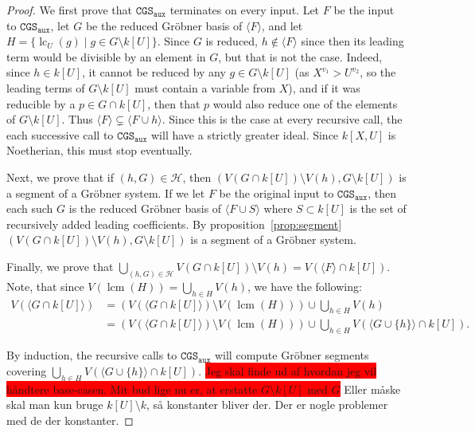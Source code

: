 \documentclass[a4paper, 12pt]{article}
\DeclareMathOperator{\LC}{lc}
\DeclareMathOperator{\lcm}{lcm}
\theoremstyle{changedot}
\theoremstyle{changedotbreak}
\theoremstyle{nonumberplain}
\newtheorem{proof}{Proof}
\begin{document}
\begin{proof}
  We first prove that $\mathtt{CGS_{aux}}$ terminates on every input. Let $F$ be the input to $\mathtt{CGS_{aux}}$, let $G$ be the reduced Gröbner basis of $\langle F \rangle$, and let $H = \{\LC_{U}(g) \mid g \in G \setminus k[U]\}$. Since $G$ is reduced, $h \notin \langle F \rangle$ since then its leading term would be divisible by an element in $G$, but that is not the case. Indeed, since $h \in k[U]$, it cannot be reduced by any $g \in G \setminus k[U]$ (as $X^{v_{1}} > U^{v_{2}}$, so the leading terms of $G \setminus k[U]$ must contain a variable from $X$), and if it was reducible by a $p \in G \cap k[U]$, then that $p$ would also reduce one of the elements of $G \setminus k[U]$. Thus $\langle F \rangle \subsetneq \langle F \cup {h} \rangle$. Since this is the case at every recursive call, the each successive call to $\mathtt{CGS_{aux}}$ will have a strictly greater ideal. Since $k[X, U]$ is Noetherian, this must stop eventually.

  Next, we prove that if $(h, G) \in \mathcal H$, then $(V(G \cap k[U]) \setminus V(h), G \setminus k[U])$ is a segment of a Gröbner system. If we let $F$ be the original input to $\mathtt{CGS_{aux}}$, then each such $G$ is the reduced Gröbner basis of $\langle F \cup S \rangle$ where $S \subset k[U]$ is the set of recursively added leading coefficients. By proposition~\ref{prop:segment} $(V(G \cap k[U]) \setminus V(h), G \setminus k[U])$ is a segment of a Gröbner system.

  Finally, we prove that $\bigcup_{(h, G) \in \mathcal H} V(G \cap k[U]) \setminus V(h) = V(\langle F \rangle \cap k[U])$. Note, that since $V(\lcm(H)) = \bigcup_{h \in H} V(h)$, we have the following:
  \begin{align*} V(\langle G \cap k[U] \rangle)
    &= \left( V(\langle G \cap k[U] \rangle) \setminus V(\lcm(H)) \right) \cup \bigcup_{h \in H} V(h) \\
    &= \left( V(\langle G \cap k[U] \rangle) \setminus V(\lcm(H)) \right) \cup \bigcup_{h \in H} V(\langle G \cup \{h\} \rangle \cap k[U]).
  \end{align*}

  By induction, the recursive calls to $\mathtt{CGS_{aux}}$ will compute Gröbner segments covering $\bigcup_{h \in H} V(\langle G \cup \{h\} \rangle \cap k[U])$. \colorbox{red}{Jeg skal finde ud af hvordan jeg vil håndtere base-casen. Mit bud lige nu er, at erstatte $G \setminus k[U]$ med $G$}
  Eller måske skal man kun bruge $k[U]  \setminus k$, så konstanter bliver der. Der er nogle problemer med de der konstanter.
\end{proof}
\end{document}

